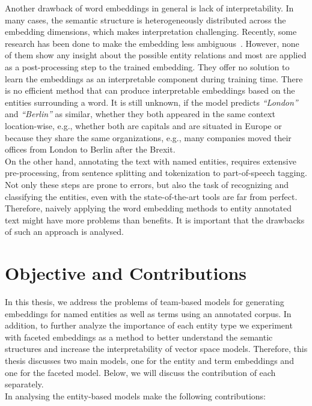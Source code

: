 Another drawback of word embeddings in general is lack of interpretability. In many cases, the semantic structure is heterogeneously distributed across the embedding dimensions, which makes interpretation challenging. Recently, some research has been done to make the embedding less ambiguous~. However, none of them show any insight about the possible entity relations and most are applied as a post-processing step to the trained embedding. They offer no solution to learn the embeddings as an interpretable component during training time. There is no efficient method that can produce interpretable embeddings based on the entities surrounding a word. It is still unknown, if the model predicts \emph{``London''} and \emph{``Berlin''} as similar, whether they both appeared in the same context location-wise, e.g., whether both are capitals and are situated in Europe or because they share the same organizations, e.g., many companies moved their offices from London to Berlin after the Brexit. \\
On the other hand, annotating the text with named entities, requires extensive pre-processing, from sentence splitting and tokenization to part-of-speech tagging. Not only these steps are prone to errors, but also the task of recognizing and classifying the entities, even with the state-of-the-art tools are far from perfect. Therefore, naively applying the word embedding methods to entity annotated text might have more problems than benefits. It is important that the drawbacks of such an approach is analysed. 

%

\section{Objective and Contributions}
In this thesis, we address the problems of team-based models for generating embeddings for named entities as well as terms using an annotated corpus. In addition, to further analyze the importance of each entity type we experiment with faceted embeddings as a method to better understand the semantic structures and increase the interpretability of vector space models. Therefore, this thesis discusses two main models, one for the entity and term embeddings and one for the faceted model. Below, we will discuss the contribution of each separately.\\
In analysing the entity-based models make the following contributions:


